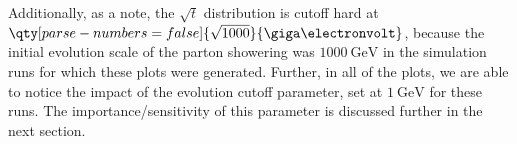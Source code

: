 Additionally, as a note, the $\sqrt{t}$ distribution is cutoff hard at $\qty[parse-numbers=false]{\sqrt{1000}}{\giga\electronvolt}$, because the initial evolution scale of the parton showering was $\qty{1000}{\giga\electronvolt}$ in the simulation runs for which these plots were generated. Further, in all of the plots, we are able to notice the impact of the evolution cutoff parameter, set at $\qty{1}{\giga\electronvolt}$ for these runs. The importance/sensitivity of this parameter is discussed further in the next section.


